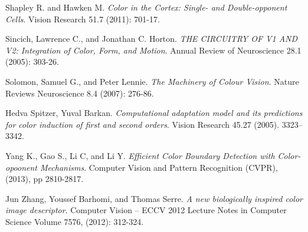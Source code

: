 \documentclass[journal,onecolumn]{IEEEtran}
\begin{document}
\begin{thebibliography}{1}
    Shapley R. and Hawken M.
    \emph{Color in the Cortex: Single- and Double-opponent Cells}.
    Vision Research 51.7 (2011): 701-17.

    Sincich, Lawrence C., and Jonathan C. Horton.
    \emph{THE CIRCUITRY OF V1 AND V2: Integration of Color, Form, and Motion}.
    Annual Review of Neuroscience 28.1 (2005): 303-26.
    
    Solomon, Samuel G., and Peter Lennie.
    \emph{The Machinery of Colour Vision}.
    Nature Reviews Neuroscience 8.4 (2007): 276-86.

    Hedva Spitzer, Yuval Barkan.
    \emph{Computational adaptation model and its predictions for color induction of first and second orders}.
    Vision Research 45.27 (2005). 3323–3342.

    Yang K., Gao S., Li C, and Li Y.
    \emph{Efficient Color Boundary Detection with Color-opoonent Mechanisms}.
    Computer Vision and Pattern Recognition (CVPR), (2013), pp 2810-2817.

    Jun Zhang, Youssef Barhomi, and Thomas Serre.
    \emph{A new biologically inspired color image descriptor}.
    Computer Vision – ECCV 2012
    Lecture Notes in Computer Science Volume 7576, (2012): 312-324.

\end{thebibliography}

% 




\end{document}

